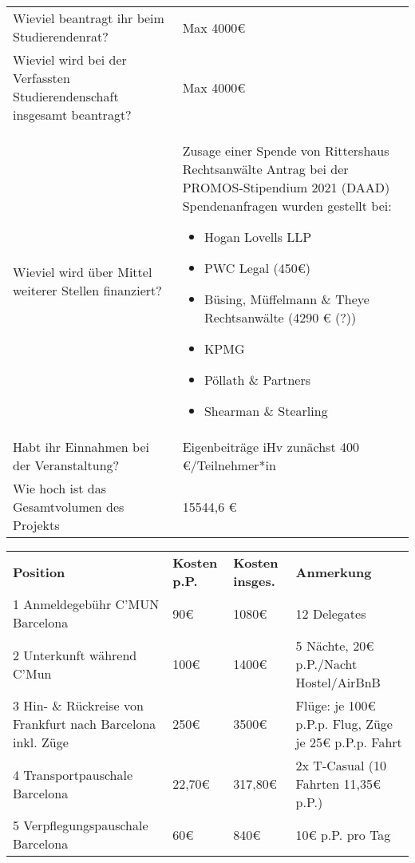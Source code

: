 {\begin{tabularx}{\textwidth}{X X}
        Wieviel beantragt ihr beim Studierendenrat?                             & Max 4000€       \\
        Wieviel wird bei der Verfassten Studierendenschaft insgesamt beantragt? & Max 4000€    \\
        Wieviel wird über Mittel weiterer Stellen finanziert?                   & 
        Zusage einer Spende von Rittershaus Rechtsanwälte \newline
        Antrag bei der PROMOS-Stipendium 2021 (DAAD)\newline
        Spendenanfragen wurden gestellt bei:
        \begin{itemize}
            \item Hogan Lovells LLP
            \item PWC Legal (450€)
            \item Büsing, Müffelmann \& Theye Rechtsanwälte (4290 € (?))
            \item KPMG
            \item Pöllath \& Partners
            \item Shearman \& Stearling
        \end{itemize}\\
        Habt ihr Einnahmen bei der Veranstaltung?                               & Eigenbeiträge iHv zunächst 400 €/Teilnehmer*in\\
        Wie hoch ist das Gesamtvolumen des Projekts                             & 15544,6 €\\
    \end{tabularx}
    \newline
    \vspace*{2em}
    \newline
    \begin{tabular}{p{5cm} p{1.5cm} p{1.5cm} p{7cm}}
        \textbf{Position} & \textbf{Kosten p.P.} & \textbf{Kosten insges.} & \textbf{Anmerkung} \\
        1 Anmeldegebühr C'MUN Barcelona & 90€ & 1080€ & 12 Delegates\\
        2 Unterkunft während C'Mun & 100€ & 1400€ & 5 Nächte, 20€ p.P./Nacht Hostel/AirBnB\\
        3 Hin- \& Rückreise von Frankfurt nach Barcelona inkl. Züge & 250€ & 3500€ & Flüge: je 100€ p.P.p. Flug, Züge je 25€ p.P.p. Fahrt\\
        4 Transportpauschale Barcelona & 22,70€ & 317,80€ & 2x T-Casual (10 Fahrten 11,35€ p.P.)\\
        5 Verpflegungspauschale Barcelona & 60€ & 840€ & 10€ p.P. pro Tag\\

\end{tabular}}

